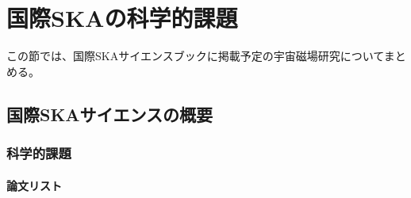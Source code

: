 \newpage
\setcounter{section}{1}\section{国際SKAの科学的課題}
\label{c06.s2}

この節では、国際SKAサイエンスブックに掲載予定の宇宙磁場研究についてまとめる。

\subsection{国際SKAサイエンスの概要}
\label{c06.s2.ss1}

\subsubsection{科学的課題}
\label{c06.s2.ss1.sss1}

\paragraph{論文リスト}

